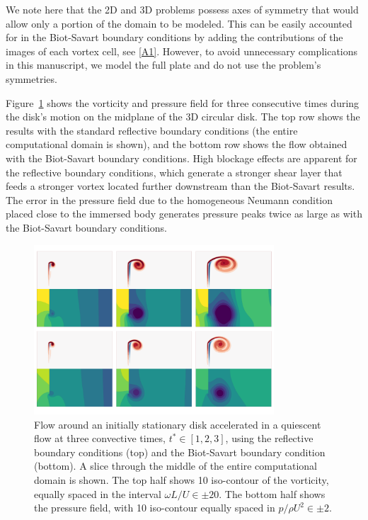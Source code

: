 \documentclass[final,1p,times]{elsarticle}
\begin{document}
We note here that the 2D and 3D problems possess axes of symmetry that would allow only a portion of the domain to be modeled. This can be easily accounted for in the Biot-Savart boundary conditions by adding the contributions of the images of each vortex cell, see \ref{A1}. However, to avoid unnecessary complications in this manuscript, we model the full plate and do not use the problem's symmetries.

Figure~\ref{fig:disk_flow_1} shows the vorticity and pressure field for three consecutive times during the disk's motion on the midplane of the 3D circular disk. The top row shows the results with the standard reflective boundary conditions (the entire computational domain is shown), and the bottom row shows the flow obtained with the Biot-Savart boundary conditions. High blockage effects are apparent for the reflective boundary conditions, which generate a stronger shear layer that feeds a stronger vortex located further downstream than the Biot-Savart results. The error in the pressure field due to the homogeneous Neumann condition placed close to the immersed body generates pressure peaks twice as large as with the Biot-Savart boundary conditions.

\begin{figure}
    \centering
    \includegraphics[trim={0cm 1cm 0cm 0.5cm},clip,width=0.8\textwidth]{tex/fig/flow_disk.png}
    \caption{Flow around an initially stationary disk accelerated in a quiescent flow at three convective times, $t^*\in [1,2,3]$, using the reflective boundary conditions (top) and the Biot-Savart boundary condition (bottom). A slice through the middle of the entire computational domain is shown. The top half shows 10 iso-contour of the vorticity, equally spaced in the interval $\omega L/U\in\pm20$. The bottom half shows the pressure field, with 10 iso-contour equally spaced in $p/\rho U^2\in\pm2$.}
    \label{fig:disk_flow_1}
\end{figure}
\end{document}
